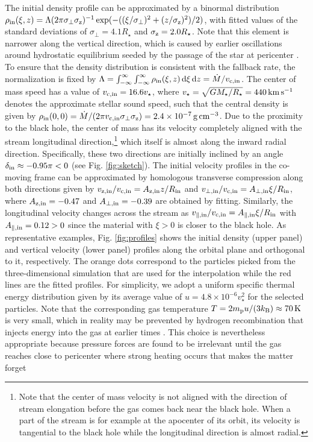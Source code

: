 \documentclass[a4paper,fleqn,usenatbib]{mnras}
\newcommand*\diff{\mathop{}\!\mathrm{d}}
\newcommand{\mstar}{M_{\star}}
\newcommand{\rstar}{R_{\star}}
\def\gpercm3{\, \rm g \, cm^{-3}}
\def\kmpers{\, \rm km \, s^{-1}}
\begin{document}
The initial density profile can be approximated by a binormal distribution $\rho_{\rm in} (\xi,z) = \Lambda (2 \pi \sigma_{\perp} \sigma_{\rm z})^{-1} \exp(-((\xi/\sigma_{\perp})^2 + (z/\sigma_{\rm z})^2)/2 )$, with fitted values of the standard deviations of $\sigma_{\perp} = 4.1 \rstar$ and $\sigma_{\rm z} =2.0 \rstar$. Note that this element is narrower along the vertical direction, which is caused by earlier oscillations around hydrostatic equilibrium seeded by the passage of the star at pericenter \citep{coughlin2016-pancakes}. To ensure that the density distribution is consistent with the fallback rate, the normalization is fixed by $\Lambda = \int_{-\infty}^{\infty} \int_{-\infty}^{\infty} \rho_{\rm in}(\xi,z) \diff \xi \diff z = \dot{M} / v_{\rm c, in}$. The center of mass speed has a value of $v_{\rm c, in} = 16.6 v_{\star}$, where $v_{\star} = \sqrt{G \mstar / \rstar} = 440 \kmpers$ denotes the approximate stellar sound speed, such that the central density is given by $ \rho_{\rm in}(0,0) = \dot{M}/ (2 \pi v_{\rm c, in} \sigma_{\perp} \sigma_{\rm z}) = 2.4 \times 10^{-7} \gpercm3$. Due to the proximity to the black hole, the center of mass has its velocity completely aligned with the stream longitudinal direction,\footnote{Note that the center of mass velocity is not aligned with the direction of stream elongation before the gas comes back near the black hole. When a part of the stream is for example at the apocenter of its orbit, its velocity is tangential to the black hole while the longitudinal direction is almost radial.} which itself is almost along the inward radial direction. Specifically, these two directions are initially inclined by an angle $\delta_{\rm in} \approx -0.95 \pi < 0$ (see Fig. \ref{fig:sketch}). The initial velocity profiles in the co-moving frame can be approximated by homologous transverse compression along both directions given by $v_{\rm z,in}/v_{\rm c,in} = A_{\rm z,in} z / R_{\rm in}$ and $v_{\rm \perp,in}/v_{\rm c,in} = A_{\rm\perp,in} \xi / R_{\rm in}$, where $A_{\rm z,in} = -0.47$ and $A_{\rm\perp,in} = -0.39$ are obtained by fitting. Similarly, the longitudinal velocity changes across the stream as $v_{\rm\parallel,in}/v_{\rm c,in} = A_{\rm \parallel,in} \xi / R_{\rm in}$ with $A_{\rm \parallel,in} = 0.12>0$ since the material with $\xi >0$ is closer to the black hole. As representative examples, Fig. \ref{fig:profiles} shows the initial density (upper panel) and vertical velocity (lower panel) profiles along the orbital plane and orthogonal to it, respectively. The orange dots correspond to the particles picked from the three-dimensional simulation that are used for the interpolation while the red lines are the fitted profiles. For simplicity, we adopt a uniform specific thermal energy distribution given by its average value of $u = 4.8 \times 10^{-6} v^2_{\star}$ for the selected particles. Note that the corresponding gas temperature $T = 2 m_{\rm p} u /(3 k_{\rm B}) \approx 70 \, \rm K$ is very small, which in reality may be prevented by hydrogen recombination that injects energy into the gas at earlier times \citep{coughlin2016-structure}. This choice is nevertheless appropriate because pressure forces are found to be irrelevant until the gas reaches close to pericenter where strong heating occurs that makes the matter forget 
\end{document}
